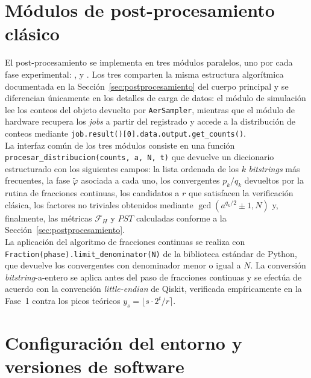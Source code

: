 \documentclass[12pt, spanish]{book}
\begin{document}
\section{Módulos de post-procesamiento clásico}
\label{app:postproc-modulos}

El post-procesamiento se implementa en tres módulos paralelos, uno por cada fase experimental: ,  y . Los tres comparten la misma estructura algorítmica documentada en la Sección~\ref{sec:postprocesamiento} del cuerpo principal y se diferencian únicamente en los detalles de carga de datos: el módulo de simulación lee los conteos del objeto devuelto por \texttt{AerSampler}, mientras que el módulo de hardware recupera los \textit{jobs} a partir del  registrado y accede a la distribución de conteos mediante \texttt{job.result()[0].data.output.get\_counts()}.\\

La interfaz común de los tres módulos consiste en una función \texttt{procesar\_distribucion\-(counts, a, N, t)} que devuelve un diccionario estructurado con los siguientes campos: la lista ordenada de los $k$ \textit{bitstrings} más frecuentes, la fase $\tilde{\varphi}$ asociada a cada uno, los convergentes $p_k/q_k$ devueltos por la rutina de fracciones continuas, los candidatos a $r$ que satisfacen la verificación clásica, los factores no triviales obtenidos mediante $\gcd(a^{q_k/2} \pm 1, N)$ y, finalmente, las métricas $\mathcal{F}_H$ y $PST$ calculadas conforme a la Sección~\ref{sec:postprocesamiento}.\\

La aplicación del algoritmo de fracciones continuas se realiza con \texttt{Fraction(phase).li\-mit\_denominator(N)} de la biblioteca estándar de Python, que devuelve los convergentes con denominador menor o igual a $N$. La conversión \textit{bitstring}-a-entero se aplica antes del paso de fracciones continuas y se efectúa de acuerdo con la convención \textit{little-endian} de Qiskit, verificada empíricamente en la Fase~1 contra los picos teóricos $y_s = \lfloor s \cdot 2^t / r \rceil$.

\section{Configuración del entorno y versiones de software}
\end{document}
